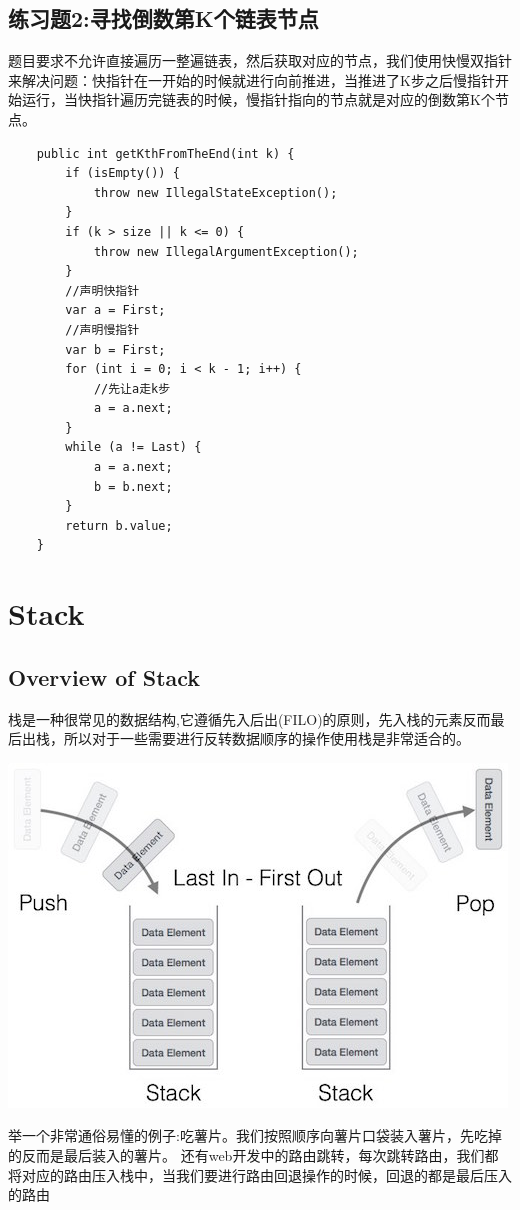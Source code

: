 \documentclass[
	11pt,
	fleqn,
	a4paper,
]{LegrandOrangeBook}
\begin{document}
\section{练习题2:寻找倒数第K个链表节点}
\begin{example}
    题目要求不允许直接遍历一整遍链表，然后获取对应的节点，我们使用快慢双指针来解决问题：快指针在一开始的时候就进行向前推进，当推进了K步之后慢指针开始运行，当快指针遍历完链表的时候，慢指针指向的节点就是对应的倒数第K个节点。
\end{example}
\begin{verbatim}
    public int getKthFromTheEnd(int k) {
        if (isEmpty()) {
            throw new IllegalStateException();
        }
        if (k > size || k <= 0) {
            throw new IllegalArgumentException();
        }
        //声明快指针
        var a = First;
        //声明慢指针
        var b = First;
        for (int i = 0; i < k - 1; i++) {
            //先让a走k步
            a = a.next;
        }
        while (a != Last) {
            a = a.next;
            b = b.next;
        }
        return b.value;
    }
\end{verbatim}
\chapter{Stack}
\section{Overview of Stack}
栈是一种很常见的数据结构,它遵循先入后出(FILO)的原则，先入栈的元素反而最后出栈，所以对于一些需要进行反转数据顺序的操作使用栈是非常适合的。
\begin{center}
    \includegraphics[scale=0.5]{Images/stack.png}
\end{center}
举一个非常通俗易懂的例子:吃薯片。我们按照顺序向薯片口袋装入薯片，先吃掉的反而是最后装入的薯片。
还有web开发中的路由跳转，每次跳转路由，我们都将对应的路由压入栈中，当我们要进行路由回退操作的时候，回退的都是最后压入的路由
\end{document}
